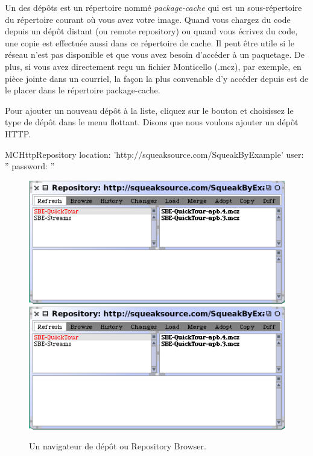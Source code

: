\documentclass[a4paper,10pt,twoside]{book}
\begin{document}
Un des d\'ep\^ots est un r\'epertoire nomm\'e \emph{package-cache} qui
est un sous-r\'epertoire du r\'epertoire courant o\`u vous avez
votre image.
Quand vous chargez du code depuis un d\'ep\^ot distant (ou remote repository)
ou quand vous \'ecrivez du code, une copie est effectu\'ee aussi dans ce
r\'epertoire de cache. Il peut \^etre utile si le r\'eseau n'est pas 
disponible et que vous avez besoin d'acc\'eder \`a un paquetage. De plus,
si vous avez directement re\c{c}u un fichier Monticello (.mcz), par exemple, 
en pi\`{e}ce jointe dans un courriel, la fa\c{c}on la plus convenable d'y acc\'eder
depuis \sq est de le placer dans le r\'epertoire package-cache.

Pour ajouter un nouveau d\'ep\^ot \`a la liste, cliquez sur le bouton 
 et choisissez le type de d\'ep\^ot dans le menu
flottant. Disons que nous voulons ajouter un d\'ep\^ot HTTP.

\begin{code}{}
MCHttpRepository
	location: 'http://squeaksource.com/SqueakByExample'
	user: ''
	password: ''
\end{code}

\begin{figure}[btp]
	\begin{center}
	\ifluluelse
		{\includegraphics[width=\textwidth]{SqueakSource-SBE}}
		{\includegraphics[scale=0.7]{SqueakSource-SBE}}
	\end{center}
	\caption{Un navigateur de d\'ep\^ot ou Repository Browser.}
	\label{fig:SqueakSource:SBE}
\end{figure}
\noindent
\end{document}
